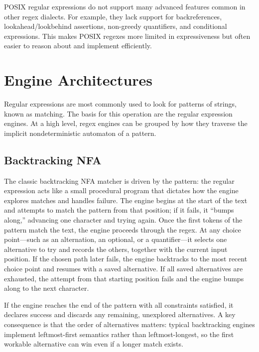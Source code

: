 POSIX regular expressions do not support many advanced features common in other regex dialects. For example, they lack support for backreferences, lookahead/lookbehind assertions, non-greedy quantifiers, and conditional expressions. This makes POSIX regexes more limited in expressiveness but often easier to reason about and implement efficiently.

\section{Engine Architectures}
Regular expressions are most commonly used to look for patterns of strings, known as matching. The basis for this operation are the regular expression engines.
At a high level, regex engines can be grouped by how they traverse the implicit nondeterministic automaton of a pattern.

\subsection{Backtracking NFA}
The classic backtracking NFA matcher is driven by the pattern: the regular expression acts like a small procedural program that dictates how the engine explores matches and handles failure. The engine begins at the start of the text and attempts to match the pattern from that position; if it fails, it “bumps along,” advancing one character and trying again. Once the first tokens of the pattern match the text, the engine proceeds through the regex. At any choice point—such as an alternation, an optional, or a quantifier—it selects one alternative to try and records the others, together with the current input position. If the chosen path later fails, the engine backtracks to the most recent choice point and resumes with a saved alternative. If all saved alternatives are exhausted, the attempt from that starting position fails and the engine bumps along to the next character.

If the engine reaches the end of the pattern with all constraints satisfied, it declares success and discards any remaining, unexplored alternatives. A key consequence is that the order of alternatives matters: typical backtracking engines implement leftmost-first semantics rather than leftmost-longest, so the first workable alternative can win even if a longer match exists.

